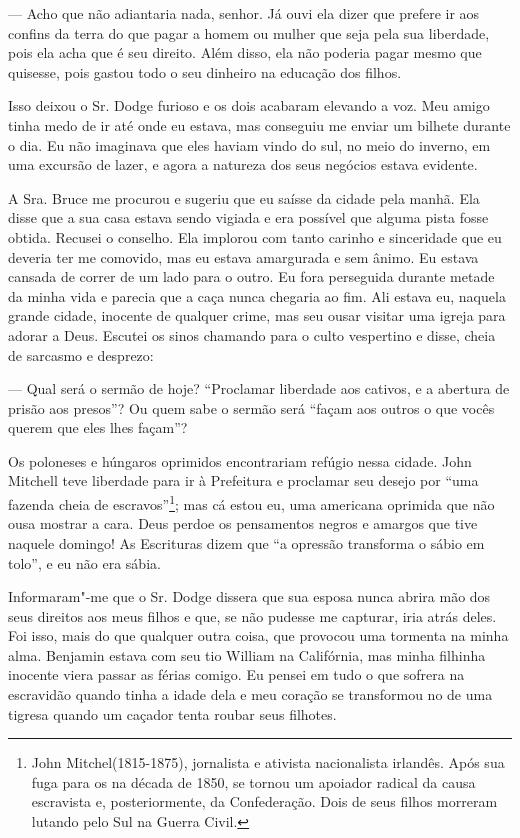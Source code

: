 --- Acho que não adiantaria nada,
senhor. Já ouvi ela dizer que prefere ir aos confins da terra do que
pagar a homem ou mulher que seja pela sua liberdade, pois ela acha que é
seu direito. Além disso, ela não poderia pagar mesmo que quisesse, pois
gastou todo o seu dinheiro na educação dos filhos.

Isso deixou o Sr. Dodge furioso e os
dois acabaram elevando a voz. Meu amigo tinha medo de ir até onde eu
estava, mas conseguiu me enviar um bilhete durante o dia. Eu não
imaginava que eles haviam vindo do sul, no meio do inverno, em uma
excursão de lazer, e agora a natureza dos seus negócios estava evidente.

A Sra. Bruce me procurou e sugeriu que
eu saísse da cidade pela manhã. Ela disse que a sua casa estava sendo
vigiada e era possível que alguma pista fosse obtida. Recusei o
conselho. Ela implorou com tanto carinho e sinceridade que eu deveria
ter me comovido, mas eu estava amargurada e sem ânimo. Eu estava cansada
de correr de um lado para o outro. Eu fora perseguida durante metade da
minha vida e parecia que a caça nunca chegaria ao fim. Ali estava eu,
naquela grande cidade, inocente de qualquer crime, mas seu ousar visitar
uma igreja para adorar a Deus. Escutei os sinos chamando para o culto
vespertino e disse, cheia de sarcasmo e desprezo:

--- Qual será o sermão de hoje? ``Proclamar liberdade aos cativos, e a
abertura de prisão aos presos''? Ou quem sabe o sermão será ``façam aos
outros o que vocês querem que eles lhes façam''?

Os poloneses e húngaros oprimidos encontrariam refúgio nessa cidade.
John Mitchell teve liberdade para ir à Prefeitura e proclamar seu desejo
por ``uma fazenda cheia de escravos''\footnote{John Mitchel(1815-1875),
  jornalista e ativista nacionalista irlandês. Após sua fuga para os 
  na década de 1850, se tornou um apoiador radical da causa escravista
  e, posteriormente, da Confederação. Dois de seus filhos morreram
  lutando pelo Sul na Guerra Civil.}; mas cá estou eu, uma americana
oprimida que não ousa mostrar a cara. Deus perdoe os pensamentos negros
e amargos que tive naquele domingo! As Escrituras dizem que ``a opressão
transforma o sábio em tolo'', e eu não era sábia.

Informaram"-me que o Sr. Dodge dissera que sua esposa nunca abrira mão
dos seus direitos aos meus filhos e que, se não pudesse me capturar,
iria atrás deles. Foi isso, mais do que qualquer outra coisa, que
provocou uma tormenta na minha alma. Benjamin estava com seu tio William
na Califórnia, mas minha filhinha inocente viera passar as férias
comigo. Eu pensei em tudo o que sofrera na escravidão quando tinha a
idade dela e meu coração se transformou no de uma tigresa quando um
caçador tenta roubar seus filhotes.

